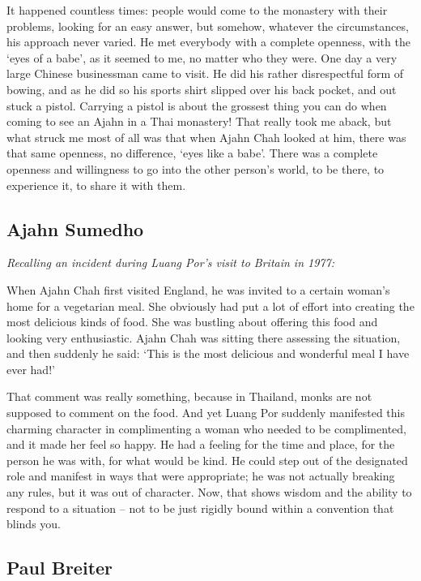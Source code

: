 It happened countless times: people would come to the monastery with
their problems, looking for an easy answer, but somehow, whatever the
circumstances, his approach never varied. He met everybody with a
complete openness, with the `eyes of a babe', as it seemed to me, no
matter who they were. One day a very large Chinese businessman came to
visit. He did his rather disrespectful form of bowing, and as he did so
his sports shirt slipped over his back pocket, and out stuck a pistol. 
Carrying a pistol is about the grossest thing you can do when coming to
see an Ajahn in a Thai monastery! That really took me aback, but what
struck me most of all was that when Ajahn Chah looked at him, there was
that same openness, no difference, `eyes like a babe'. There was a
complete openness and willingness to go into the other person's world, 
to be there, to experience it, to share it with them. 

\subsection{Ajahn Sumedho}

\emph{Recalling an incident during Luang Por's visit to Britain in 1977:}

When Ajahn Chah first visited England, he was invited to a certain
woman's home for a vegetarian meal. She obviously had put a lot of
effort into creating the most delicious kinds of food. She was bustling
about offering this food and looking very enthusiastic. Ajahn Chah was
sitting there assessing the situation, and then suddenly he said: `This
is the most delicious and wonderful meal I have ever had!'

That comment was really something, because in Thailand, monks are not
supposed to comment on the food. And yet Luang Por suddenly manifested
this charming character in complimenting a woman who needed to be
complimented, and it made her feel so happy. He had a feeling for the
time and place, for the person he was with, for what would be kind. He
could step out of the designated role and manifest in ways that were
appropriate; he was not actually breaking any rules, but it was out of
character. Now, that shows wisdom and the ability to respond to a
situation -- not to be just rigidly bound within a convention that
blinds you. 

\subsection{Paul Breiter}

